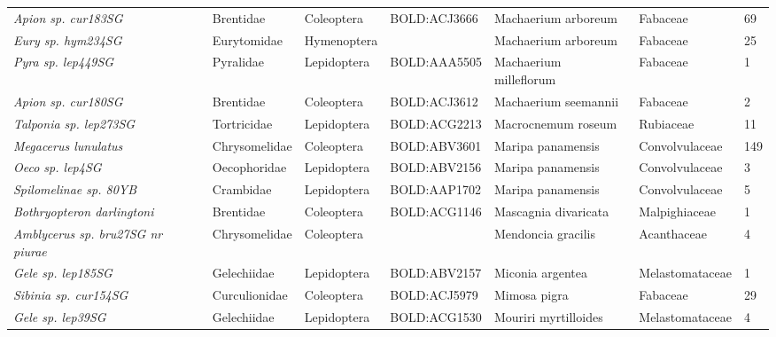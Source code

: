 \documentclass[11pt]{article}
\begin{document}
\begin{landscape}
\begin{longtable}{@{}lllllll@{}}
\textit{Apion sp. cur183SG}                           & Brentidae       & Coleoptera   & BOLD:ACJ3666 & Machaerium arboreum                & Fabaceae         & 69    \\
\textit{Eury sp. hym234SG}                            & Eurytomidae     & Hymenoptera  &              & Machaerium arboreum                & Fabaceae         & 25    \\
\textit{Pyra sp. lep449SG}                            & Pyralidae       & Lepidoptera  & BOLD:AAA5505 & Machaerium milleflorum             & Fabaceae         & 1     \\
\textit{Apion sp. cur180SG}                           & Brentidae       & Coleoptera   & BOLD:ACJ3612 & Machaerium seemannii               & Fabaceae         & 2     \\
\textit{Talponia sp. lep273SG}                        & Tortricidae     & Lepidoptera  & BOLD:ACG2213 & Macrocnemum roseum                 & Rubiaceae        & 11    \\
\textit{Megacerus lunulatus}                          & Chrysomelidae   & Coleoptera   & BOLD:ABV3601 & Maripa panamensis                  & Convolvulaceae   & 149   \\
\textit{Oeco sp. lep4SG}                              & Oecophoridae    & Lepidoptera  & BOLD:ABV2156 & Maripa panamensis                  & Convolvulaceae   & 3     \\
\textit{Spilomelinae sp. 80YB}                        & Crambidae       & Lepidoptera  & BOLD:AAP1702 & Maripa panamensis                  & Convolvulaceae   & 5     \\
\textit{Bothryopteron darlingtoni}                    & Brentidae       & Coleoptera   & BOLD:ACG1146 & Mascagnia divaricata               & Malpighiaceae    & 1     \\
\textit{Amblycerus sp. bru27SG nr piurae}             & Chrysomelidae   & Coleoptera   &              & Mendoncia gracilis                 & Acanthaceae      & 4     \\
\textit{Gele sp. lep185SG}                            & Gelechiidae     & Lepidoptera  & BOLD:ABV2157 & Miconia argentea                   & Melastomataceae  & 1     \\
\textit{Sibinia sp. cur154SG}                         & Curculionidae   & Coleoptera   & BOLD:ACJ5979 & Mimosa pigra                       & Fabaceae         & 29    \\
\textit{Gele sp. lep39SG}                             & Gelechiidae     & Lepidoptera  & BOLD:ACG1530 & Mouriri myrtilloides               & Melastomataceae  & 4     \\

\end{longtable}
\end{landscape}
\end{document}
